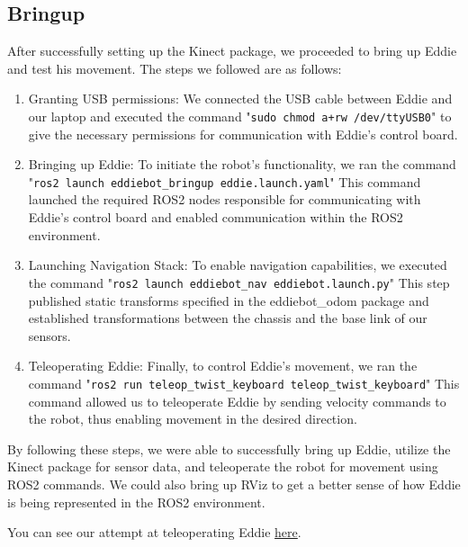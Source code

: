 \subsection{Bringup}
After successfully setting up the Kinect package, we proceeded to bring up Eddie and test his movement. The steps we followed are as follows:
\begin{enumerate}
    \item Granting USB permissions: We connected the USB cable between Eddie and our laptop and executed the command "\textcolor{NavyBlue}{\texttt{sudo chmod a+rw /dev/ttyUSB0}}" to give the necessary permissions for communication with Eddie's control board.

    \item Bringing up Eddie: To initiate the robot's functionality, we ran the command "\textcolor{NavyBlue}{\texttt{ros2 launch eddiebot\_bringup eddie.launch.yaml}}" This command launched the required ROS2 nodes responsible for communicating with Eddie's control board and enabled communication within the ROS2 environment.

    \item Launching Navigation Stack: To enable navigation capabilities, we executed the command "\textcolor{NavyBlue}{\texttt{ros2 launch eddiebot\_nav eddiebot.launch.py}}" This step published static transforms specified in the eddiebot\_odom package and established transformations between the chassis and the base link of our sensors.

    \item Teleoperating Eddie: Finally, to control Eddie's movement, we ran the command "\textcolor{NavyBlue}{\texttt{ros2 run teleop\_twist\_keyboard teleop\_twist\_keyboard}}" This command allowed us to teleoperate Eddie by sending velocity commands to the robot, thus enabling movement in the desired direction.    
\end{enumerate}
By following these steps, we were able to successfully bring up Eddie, utilize the Kinect package for sensor data, and teleoperate the robot for movement using ROS2 commands. We could also bring up RViz to get a better sense of how Eddie is being represented in the ROS2 environment.

You can see our attempt at teleoperating Eddie \href{https://youtu.be/LtZwPk3DaKk}{here}.
